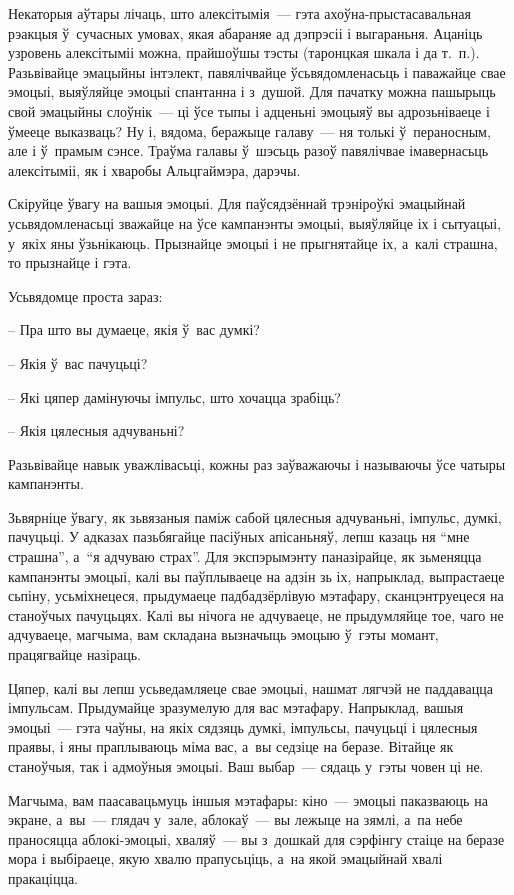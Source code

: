 Некаторыя аўтары лічаць, што алексітымія~--- гэта ахоўна-прыстасавальная рэакцыя ў~сучасных умовах, якая абараняе ад дэпрэсіі і выгараньня. Ацаніць узровень алексітыміі можна, прайшоўшы тэсты (таронцкая шкала і да т.~п.). Разьвівайце эмацыйны інтэлект, павялічвайце ўсьвядомленасьць і паважайце свае эмоцыі, выяўляйце эмоцыі спантанна і з~душой. Для пачатку можна пашырыць свой эмацыйны слоўнік~--- ці ўсе тыпы і адценьні эмоцыяў вы адрозьніваеце і ўмееце выказваць? Ну і, вядома, беражыце галаву~--- ня толькі ў~пераносным, але і ў~прамым сэнсе. Траўма галавы ў~шэсьць разоў павялічвае імавернасьць алексітыміі, як і хваробы Альцгаймэра, дарэчы.

Скіруйце ўвагу на вашыя эмоцыі. Для паўсядзённай трэніроўкі эмацыйнай усьвядомленасьці зважайце на ўсе кампанэнты эмоцыі, выяўляйце іх і сытуацыі, у~якіх яны ўзьнікаюць. Прызнайце эмоцыі і не прыгнятайце іх, а~калі страшна, то прызнайце і гэта.

Усьвядомце проста зараз: 

– Пра што вы думаеце, якія ў~вас думкі?

– Якія ў~вас пачуцьці?

– Які цяпер дамінуючы імпульс, што хочацца зрабіць?

– Якія цялесныя адчуваньні?

Разьвівайце навык уважлівасьці, кожны раз заўважаючы і называючы ўсе чатыры кампанэнты.

Зьвярніце ўвагу, як зьвязаныя паміж сабой цялесныя адчуваньні, імпульс, думкі, пачуцьці. У адказах пазьбягайце пасіўных апісаньняў, лепш казаць ня ``мне страшна'', а~``я адчуваю страх''. Для экспэрымэнту паназірайце, як зьменяцца кампанэнты эмоцыі, калі вы паўплываеце на адзін зь іх, напрыклад, выпрастаеце сьпіну, усьміхнецеся, прыдумаеце падбадзёрлівую мэтафару, сканцэнтруецеся на станоўчых пачуцьцях. Калі вы нічога не адчуваеце, не прыдумляйце тое, чаго не адчуваеце, магчыма, вам складана вызначыць эмоцыю ў~гэты момант, працягвайце назіраць.

Цяпер, калі вы лепш усьведамляеце свае эмоцыі, нашмат лягчэй не паддавацца імпульсам. Прыдумайце зразумелую для вас мэтафару. Напрыклад, вашыя эмоцыі~--- гэта чаўны, на якіх сядзяць думкі, імпульсы, пачуцьці і цялесныя праявы, і яны праплываюць міма вас, а~вы седзіце на беразе. Вітайце як станоўчыя, так і адмоўныя эмоцыі. Ваш выбар~--- сядаць у~гэты човен ці не.

Магчыма, вам паасавацьмуць іншыя мэтафары: кіно~--- эмоцыі паказваюць на экране, а~вы~--- глядач у~зале, аблокаў~--- вы лежыце на зямлі, а~па небе праносяцца аблокі-эмоцыі, хваляў~--- вы з~дошкай для сэрфінгу стаіце на беразе мора і выбіраеце, якую хвалю прапусьціць, а~на якой эмацыйнай хвалі пракаціцца.

